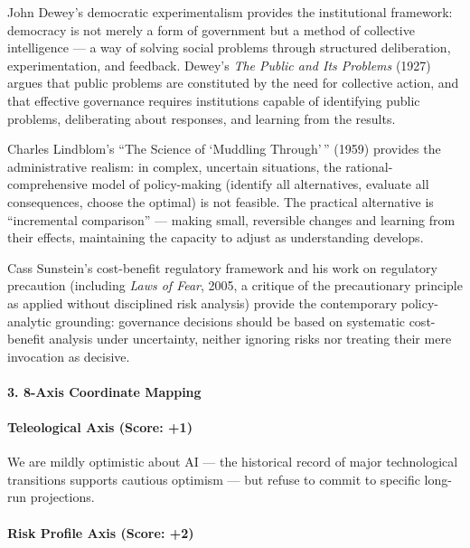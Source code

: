 John Dewey's democratic experimentalism provides the institutional
framework: democracy is not merely a form of government but a method of
collective intelligence --- a way of solving social problems through
structured deliberation, experimentation, and feedback. Dewey's
\emph{The Public and Its Problems} (1927) argues that public problems
are constituted by the need for collective action, and that effective
governance requires institutions capable of identifying public problems,
deliberating about responses, and learning from the results.

Charles Lindblom's ``The Science of `Muddling Through'\,'' (1959)
provides the administrative realism: in complex, uncertain situations,
the rational-comprehensive model of policy-making (identify all
alternatives, evaluate all consequences, choose the optimal) is not
feasible. The practical alternative is ``incremental comparison'' ---
making small, reversible changes and learning from their effects,
maintaining the capacity to adjust as understanding develops.

Cass Sunstein's cost-benefit regulatory framework and his work on
regulatory precaution (including \emph{Laws of Fear}, 2005, a critique
of the precautionary principle as applied without disciplined risk
analysis) provide the contemporary policy-analytic grounding: governance
decisions should be based on systematic cost-benefit analysis under
uncertainty, neither ignoring risks nor treating their mere invocation
as decisive.

\paragraph{3. 8-Axis Coordinate
Mapping}\label{axis-coordinate-mapping-29}

\paragraph{Teleological Axis (Score:
+1)}\label{teleological-axis-score-1-2}

We are mildly optimistic about AI --- the historical record of major
technological transitions supports cautious optimism --- but refuse to
commit to specific long-run projections.

\paragraph{Risk Profile Axis (Score:
+2)}\label{risk-profile-axis-score-2}

